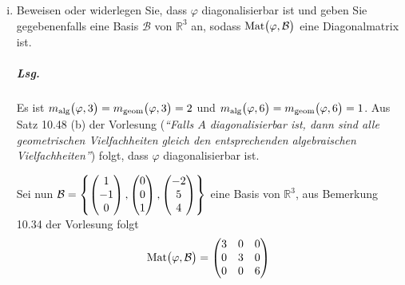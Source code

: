 \documentclass{scrreprt}
\begin{document}
\begin{enumerate}[(i)]
\item Beweisen oder widerlegen Sie, dass $\varphi$ diagonalisierbar ist und
  geben Sie gegebenenfalls eine Basis $\mathcal{B}$ von $\mathbb{R}^3$ an, sodass
  $\text{Mat}\qty\big(\varphi, \mathcal{B})$ eine Diagonalmatrix ist.

  \subparagraph{Lsg.} Es ist $m_{\text{alg}}\qty\big(\varphi, 3) =
  m_{\text{geom}}\qty\big(\varphi, 3) = 2$ und
  $m_{\text{alg}}\qty\big(\varphi, 6) =
  m_{\text{geom}}\qty\big(\varphi, 6) = 1$.
  Aus Satz 10.48 (b) der Vorlesung
  (\emph{``Falls $A$ diagonalisierbar ist, dann sind alle geometrischen
    Vielfachheiten gleich den entsprechenden algebraischen Vielfachheiten''})
  folgt, dass $\varphi$ diagonalisierbar ist.

  Sei nun $\mathcal{B} = \qty{
    \begin{pmatrix}1\\-1\\0\end{pmatrix},
    \begin{pmatrix}0\\0\\1\end{pmatrix},
    \begin{pmatrix}-2\\5\\4\end{pmatrix}
  }$ eine Basis von $\mathbb{R}^3$, aus Bemerkung 10.34 der Vorlesung folgt
  \[
    \text{Mat}\qty\big(\varphi, \mathcal{B}) = \begin{pmatrix}
      3 & 0 & 0 \\
      0 & 3 & 0 \\
      0 & 0 & 6 \\
    \end{pmatrix}
  \]
\end{enumerate}
\end{document}
